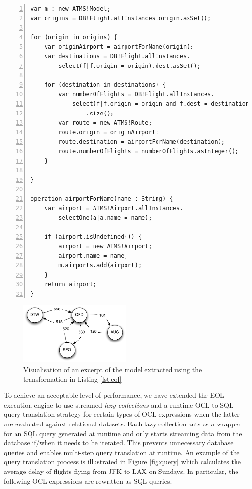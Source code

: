 \begin{lstlisting}[language=EOL, label=lst:eol, caption=EOL transformation, numbers=left]
var m : new ATMS!Model;
var origins = DB!Flight.allInstances.origin.asSet();

for (origin in origins) {
	var originAirport = airportForName(origin);
	var destinations = DB!Flight.allInstances.
		select(f|f.origin = origin).dest.asSet();
	
	for (destination in destinations) {
		var numberOfFlights = DB!Flight.allInstances.
			select(f|f.origin = origin and f.dest = destination)
				.size();
		var route = new ATMS!Route;
		route.origin = originAirport;
		route.destination = airportForName(destination);
		route.numberOfFlights = numberOfFlights.asInteger();
	}
	
}

operation airportForName(name : String) {
	var airport = ATMS!Airport.allInstances.
		selectOne(a|a.name = name);
		
	if (airport.isUndefined()) {
		airport = new ATMS!Airport;
		airport.name = name;
		m.airports.add(airport);
	}
	return airport;
}
\end{lstlisting}

\begin{figure}
 \centering
		\includegraphics[width=0.5\textwidth]{images/model.pdf}
	\caption{Visualisation of an excerpt of the model extracted using the transformation in Listing \ref{lst:eol}}
	\label{fig:model}
\end{figure}

To achieve an acceptable level of performance, we have extended the EOL execution engine to use streamed \emph{lazy collections} and a runtime OCL to SQL query translation strategy for certain types of OCL expressions when the latter are evaluated against relational datasets. Each lazy collection acts as a wrapper for an SQL query generated at runtime and only starts streaming data from the database if/when it needs to be iterated. This prevents unnecessary database queries and enables multi-step query translation at runtime. An example of the query translation process is illustrated in Figure \ref{fig:query} which calculates the average delay of flights flying from JFK to LAX on Sundays. In particular, the following OCL expressions are rewritten as SQL queries.

